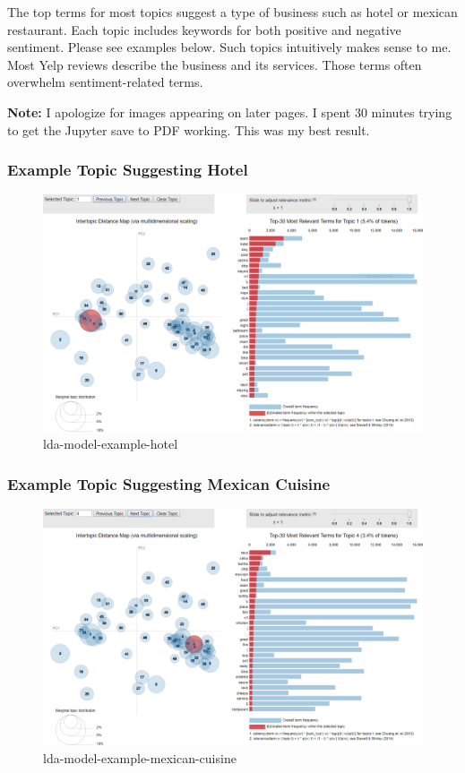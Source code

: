 \documentclass[11pt]{article}
\makeatletter
\def\maxwidth{\ifdim\Gin@nat@width>\linewidth\linewidth
    \else\Gin@nat@width\fi}
\let\Oldincludegraphics\includegraphics
\renewcommand{\includegraphics}[1]{\Oldincludegraphics[width=.8\maxwidth]{#1}}
\makeatother
\begin{document}
The top terms for most topics suggest a type of business such as hotel
or mexican restaurant. Each topic includes keywords for both positive
and negative sentiment. Please see examples below. Such topics
intuitively makes sense to me. Most Yelp reviews describe the business
and its services. Those terms often overwhelm sentiment-related terms.

\textbf{Note:} I apologize for images appearing on later pages. I spent
30 minutes trying to get the Jupyter save to PDF working. This was my
best result.

    \hypertarget{example-topic-suggesting-hotel}{%
\subsubsection{Example Topic Suggesting
Hotel}\label{example-topic-suggesting-hotel}}

\begin{figure}
\centering
\includegraphics{ntbk-imgs/task01-lda-model-example-hotel.PNG}
\caption{lda-model-example-hotel}
\end{figure}

    \hypertarget{example-topic-suggesting-mexican-cuisine}{%
\subsubsection{Example Topic Suggesting Mexican
Cuisine}\label{example-topic-suggesting-mexican-cuisine}}

\begin{figure}
\centering
\includegraphics{ntbk-imgs/task01-lda-model-example-mexican-cuisine.PNG}
\caption{lda-model-example-mexican-cuisine}
\end{figure}
\end{document}
